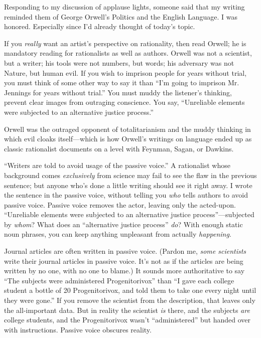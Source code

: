 {
 Responding to my discussion of applause lights, someone said that
my writing reminded them of George Orwell's Politics
and the English Language. I was honored. Especially
since I'd already thought of today's
topic. }

{
 If you \textit{really} want an artist's
perspective on rationality, then read Orwell; he is mandatory reading
for rationalists as well as authors. Orwell was not a scientist, but a
writer; his tools were not numbers, but words; his adversary was not
Nature, but human evil. If you wish to imprison people for years
without trial, you must think of some other way to say it than
``I'm going to imprison Mr. Jennings
for years without trial.'' You must muddy the
listener's thinking, prevent clear images from
outraging conscience. You say, ``Unreliable elements
were subjected to an alternative justice process.''}

{
 Orwell was the outraged opponent of totalitarianism and the muddy
thinking in which evil cloaks itself---which is how
Orwell's writings on language ended up as classic
rationalist documents on a level with Feynman, Sagan, or Dawkins.}

{
 ``Writers are told to avoid usage of the passive
voice.'' A rationalist whose background comes
\textit{exclusively} from science may fail to see the flaw in the
previous sentence; but anyone who's done a little
writing should see it right away. I wrote the sentence in the passive
voice, without telling you \textit{who} tells authors to avoid passive
voice. Passive voice removes the actor, leaving only the acted-upon.
``Unreliable elements were subjected to an alternative
justice process''---subjected by \textit{whom}? What
does an ``alternative justice
process'' \textit{do}? With enough static noun
phrases, you can keep anything unpleasant from actually
\textit{happening}.}

{
 Journal articles are often written in passive voice. (Pardon me,
\textit{some scientists} write their journal articles in passive voice.
It's not as if the articles are being written by no
one, with no one to blame.) It sounds more authoritative to say
``The subjects were administered
Progenitorivox'' than ``I gave each
college student a bottle of 20 Progenitorivox, and told them to take
one every night until they were gone.'' If you remove
the scientist from the description, that leaves only the all-important
data. But in reality the scientist \textit{is} there, and the subjects
\textit{are} college students, and the Progenitorivox
wasn't
``administered'' but handed over
with instructions. Passive voice obscures reality.}


